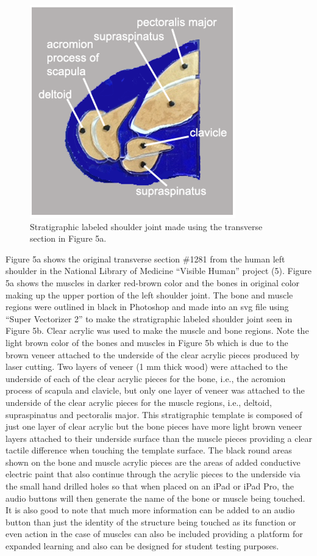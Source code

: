 \documentclass[11.5pt]{sig-alternate} %
\begin{document}
\begin{large}
\begin{figure}[h] \ContinuedFloat
       \centering
    \includegraphics[width=0.7\linewidth]{fig 5b.png}
    \caption{Stratigraphic labeled shoulder joint made using the transverse section in Figure 5a.} \ContinuedFloat
\end{figure}
\newpage
Figure 5a shows the original transverse section \#1281 from the human left shoulder in the National Library of Medicine “Visible Human” project (5).  Figure 5a shows the muscles in darker red-brown color and the bones in original color making up the upper portion of the left shoulder joint.  The bone and muscle regions were outlined in black in Photoshop and made into an svg file using “Super Vectorizer 2” to make the stratigraphic labeled shoulder joint seen in Figure 5b.  Clear acrylic was used to make the muscle and bone regions.  Note the light brown color of the bones and muscles in Figure 5b which is due to the brown veneer attached to the underside of the clear acrylic pieces produced by laser cutting.  Two layers of veneer (1 mm thick wood) were attached to the underside of each of the clear acrylic pieces for the bone, i.e., the acromion process of scapula and clavicle, but only one layer of veneer was attached to the underside of the clear acrylic pieces for the muscle regions, i.e., deltoid, supraspinatus and pectoralis major.  This stratigraphic template is composed of just one layer of clear acrylic but the bone pieces have more light brown veneer layers attached to their underside surface than the muscle pieces providing a clear tactile difference when touching the template surface.  The black round areas shown on the bone and muscle acrylic pieces are the areas of added conductive electric paint that also continue through the acrylic pieces to the underside via the small hand drilled holes so that when placed on an iPad or iPad Pro, the audio buttons will then generate the name of the bone or muscle being touched.  It is also good to note that much more information can be added to an audio button than just the identity of the structure being touched as its function or even action in the case of muscles can also be included providing a platform for expanded learning and also can be designed for student testing purposes. 


\end{large}
\end{document}
